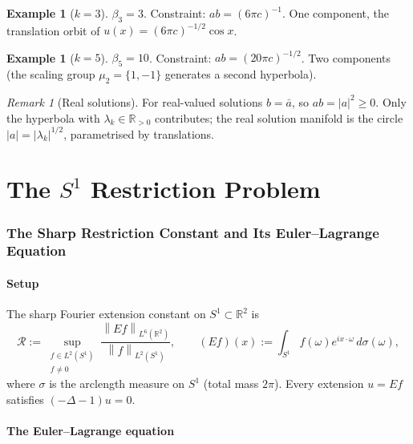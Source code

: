 \documentclass[12pt]{article}
\theoremstyle{definition}
\newtheorem{example}[theorem]{Example}
\theoremstyle{remark}
\newtheorem{remark}[theorem]{Remark}
\newcommand{\R}{\mathbb{R}}
\newcommand{\norm}[1]{\left\|#1\right\|}
\begin{document}
\begin{example}[$k=3$]
  $\beta_3=3$.  Constraint: $ab=(6\pi c)^{-1}$.  One component, the
  translation orbit of $u(x)=(6\pi c)^{-1/2}\cos x$.
\end{example}

\begin{example}[$k=5$]
  $\beta_5=10$.  Constraint: $ab=(20\pi c)^{-1/2}$.  Two components
  (the scaling group $\mu_2=\{1,-1\}$ generates a second hyperbola).
\end{example}

\begin{remark}[Real solutions]
  For real-valued solutions $b=\bar a$, so $ab=|a|^2\geq 0$.  Only the
  hyperbola with $\lambda_k\in\R_{>0}$ contributes; the real solution
  manifold is the circle $|a|=|\lambda_k|^{1/2}$, parametrised by
  translations.
\end{remark}


\part{The $S^1$ Restriction Problem}

\section{The Sharp Restriction Constant and Its Euler--Lagrange Equation}
\label{sec:restriction}

\subsection{Setup}

The sharp Fourier extension constant on $S^1\subset\R^2$ is
\[
  \mathcal R
  :=
  \sup_{\substack{f\in L^2(S^1)\\ f\neq 0}}
  \frac{\norm{Ef}_{L^6(\R^2)}}{\norm{f}_{L^2(S^1)}},
  \qquad
  (Ef)(x):=\int_{S^1}f(\omega)e^{ix\cdot\omega}\,d\sigma(\omega),
\]
where $\sigma$ is the arclength measure on $S^1$ (total mass $2\pi$).
Every extension $u=Ef$ satisfies $(-\Delta-1)u=0$.

\subsection{The Euler--Lagrange equation}
\end{document}
